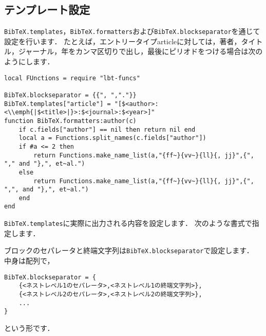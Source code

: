 \documentclass[a4paper]{ltjsarticle}
\newcommand*{\luavar}[1]{\texttt{#1}}
\begin{document}
\subsection{テンプレート設定}\label{subsec:テンプレート設定}
\luavar{BibTeX.templates}，\luavar{BibTeX.formatters}および\luavar{BibTeX.blockseparator}を通じて設定を行います．
たとえば，エントリータイプarticleに対しては，著者，タイトル，ジャーナル，年をカンマ区切りで出し，最後にピリオドをつける場合は次のようにします．
\begin{lstlisting}
local FUnctions = require "lbt-funcs"

BibTeX.blockseparator = {{", ","."}}
BibTeX.templates["article"] = "[$<author>:<\\emph{|$<title>|}>:$<journal>:$<year>]"
function BibTeX.formatters:author(c)
	if c.fields["author"] == nil then return nil end
	local a = Functions.split_names(c.fields["author"])
	if #a <= 2 then
		return Functions.make_name_list(a,"{ff~}{vv~}{ll}{, jj}",{", "," and "},", et~al.")
	else
		return Functions.make_name_list(a,"{ff~}{vv~}{ll}{, jj}",{", ",", and "},", et~al.")
	end
end
\end{lstlisting}
\luavar{BibTeX.templates}に実際に出力される内容を設定します．
次のような書式で指定します．

ブロックのセパレータと終端文字列は\luavar{BibTeX.blockseparator}で設定します．
中身は配列で，
\begin{lstlisting}
BibTeX.blockseparator = {
    {<ネストレベル1のセパレータ>,<ネストレベル1の終端文字列>},
    {<ネストレベル2のセパレータ>,<ネストレベル2の終端文字列>},
    ...
}
\end{lstlisting}
という形です．
\end{document}
